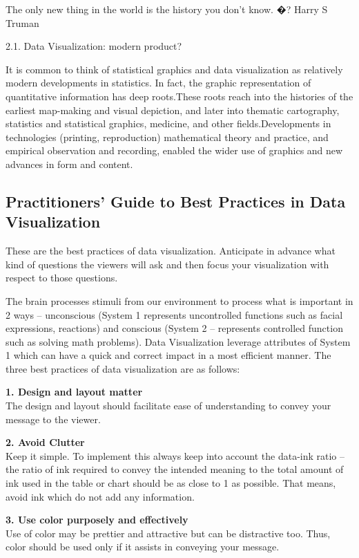 \documentclass[]{book}
\theoremstyle{definition}
\theoremstyle{definition}
\theoremstyle{definition}
\theoremstyle{remark}
\begin{document}
The only new thing in the world is the history you don't know. �? Harry
S Truman

2.1. Data Visualization: modern product?

It is common to think of statistical graphics and data visualization as
relatively modern developments in statistics. In fact, the graphic
representation of quantitative information has deep roots.These roots
reach into the histories of the earliest map-making and visual
depiction, and later into thematic cartography, statistics and
statistical graphics, medicine, and other fields.Developments in
technologies (printing, reproduction) mathematical theory and practice,
and empirical observation and recording, enabled the wider use of
graphics and new advances in form and content.

\subsection{Practitioners' Guide to Best Practices in Data
Visualization}\label{practitioners-guide-to-best-practices-in-data-visualization-1}

These are the best practices of data visualization. Anticipate in
advance what kind of questions the viewers will ask and then focus your
visualization with respect to those questions.

The brain processes stimuli from our environment to process what is
important in 2 ways -- unconscious (System 1 represents uncontrolled
functions such as facial expressions, reactions) and conscious (System 2
-- represents controlled function such as solving math problems). Data
Visualization leverage attributes of System 1 which can have a quick and
correct impact in a most efficient manner. The three best practices of
data visualization are as follows:

\textbf{1. Design and layout matter}\\
The design and layout should facilitate ease of understanding to convey
your message to the viewer.

\textbf{2. Avoid Clutter}\\
Keep it simple. To implement this always keep into account the data-ink
ratio -- the ratio of ink required to convey the intended meaning to the
total amount of ink used in the table or chart should be as close to 1
as possible. That means, avoid ink which do not add any information.

\textbf{3. Use color purposely and effectively}\\
Use of color may be prettier and attractive but can be distractive too.
Thus, color should be used only if it assists in conveying your message.
\end{document}
